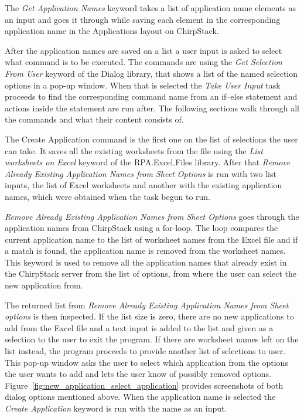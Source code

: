 The \textit{Get Application Names} keyword takes a list of application name elements as an input and goes it through while saving each element in the corresponding application name in the Applications layout on ChirpStack.

After the application names are saved on a list a user input is asked to select what command is to be executed.
The commands are using the \textit{Get Selection From User} keyword of the Dialog library\cite{robotFramework:dialogsLibrary}, that shows a list of the named selection options in a pop-up window.
When that is selected the \textit{Take User Input} task proceeds to find the corresponding command name from an if--else statement and actions inside the statement are run after.
The following sections walk through all the commands and what their content consists of.


The Create Application command is the first one on the list of selections the user can take.
It saves all the existing worksheets from the  file using the \textit{List worksheets on Excel} keyword of the RPA.Excel.Files library\cite{rpaFramework:excelFiles}.
After that \textit{Remove Already Existing Application Names from Sheet Options} is run with two list inputs, the list of Excel worksheets and another with the existing application names, which were obtained when the task begun to run.

\textit{Remove Already Existing Application Names from Sheet Options} goes through the application names from ChirpStack using a for-loop. The loop compares the current application name to the list of worksheet names from the Excel file and if a match is found, the application name is removed from the worksheet names.
This keyword is used to remove all the application names that already exist in the ChirpStack server from the list of options, from where the user can select the new application from.

The returned list from \textit{Remove Already Existing Application Names from Sheet options} is then inspected.
If the list size is zero, there are no new applications to add from the Excel file and a text input is added to the list and given as a selection to the user to exit the program.
If there are worksheet names left on the list instead, the program proceeds to provide another list of selections to user.
This pop-up window asks the user to select which application from the options the user wants to add and lets the user know of possibly removed options.
Figure~\ref{fig:new_application_select_application} provides screenshots of both dialog options mentioned above.
When the application name is selected the \textit{Create Application} keyword is run with the name as an input.

